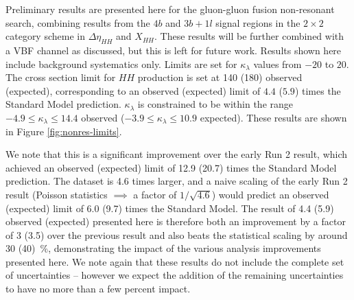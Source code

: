 Preliminary results are presented here for the gluon-gluon fusion non-resonant search, combining results from the $4b$ 
and $3b+1l$ signal regions in the $2\times 2$ category scheme in $\Delta \eta_{HH}$ and $X_{HH}$. These results will be 
further combined with a VBF channel as discussed, but this is left for future work. Results shown here include background 
systematics only. Limits are set for $\kappa_{\lambda}$ values from $-20$ to $20$. 
The cross section limit for $HH$ production is set at \SI{140}{\fb} (\SI{180}{\fb}) observed (expected), 
corresponding to an observed (expected) limit of $4.4$ ($5.9$) times the Standard Model prediction. 
$\kappa_{\lambda}$ is constrained to be within the range $-4.9 \leq \kappa_{\lambda} \leq 14.4$ observed 
($-3.9 \leq \kappa_{\lambda} \leq 10.9$ expected). These results are shown in Figure \ref{fig:nonres-limits}.

We note that this is a significant improvement over the early Run 2 result, which achieved an observed (expected) 
limit of 12.9 (20.7) times the Standard Model prediction. The dataset is 4.6 times larger, and a naive scaling 
of the early Run 2 result (Poisson statistics $\implies$ a factor of $1/\sqrt{4.6}$) would predict an observed (expected)
limit of 6.0 (9.7) times the Standard Model. The result of 4.4 (5.9) observed (expected) presented here is 
therefore both an improvement by a factor of 3 (3.5) over the previous result and also beats the statistical 
scaling by around 30 (40)~\%, demonstrating the impact of the various analysis improvements presented here. We 
note again that these results do not include the complete set of uncertainties -- however we expect the addition 
of the remaining uncertainties to have no more than a few percent impact.

